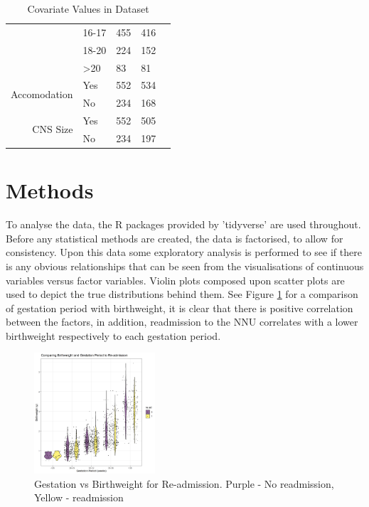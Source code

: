 \documentclass[11pt]{article}
\begin{document}
\begin{table}[ht]
\begin{tabular}{|r|l|l|l|l|}
        & 16-17             & 455                 & 416                  \\ 
        & 18-20             & 224                 & 152                  \\ 
        & \textgreater{}20  & 83                  & 81                   \\ \hline
        \multirow{2}{*}{Accomodation} & Yes               & 552                 & 534                  \\ 
        & No                & 234                 & 168                  \\ \hline
        \multirow{2}{*}{CNS Size} & Yes               & 552                 & 505                  \\ 
        & No                & 234                 & 197                  \\ \hline
    \end{tabular}
    \caption{Covariate Values in Dataset}
    \label{tab:nnu-cns-analysis}
\end{table}

\section{Methods}\label{sec:method}
To analyse the data, the R packages provided by 'tidyverse' are used throughout. Before any statistical methods are created, the data is factorised, to allow for consistency. Upon this data some exploratory analysis is performed to see if there is any obvious relationships that can be seen from the visualisations of continuous variables versus factor variables. Violin plots composed upon scatter plots are used to depict the true distributions behind them. See Figure \ref{img:bwt-gest} for a comparison of gestation period with birthweight, it is clear that there is positive correlation between the factors, in addition, readmission to the NNU correlates with a lower birthweight respectively to each gestation period.

\begin{figure}[ht]
    \centering
    \includegraphics[width=0.4\textwidth]{images/bwt.gest.png}
    \caption{Gestation vs Birthweight for Re-admission. Purple - No readmission, Yellow - readmission}
    \label{img:bwt-gest}
\end{figure}
\end{document}
